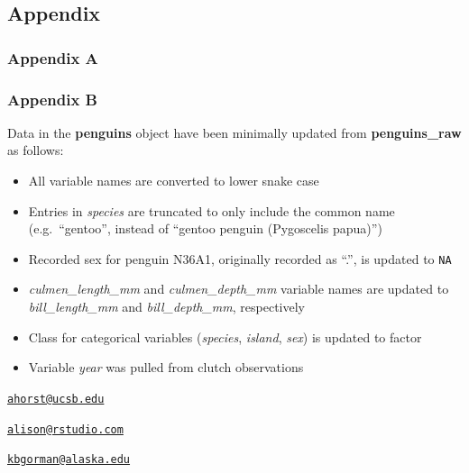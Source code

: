 \hypertarget{appendix}{%
\subsection{Appendix}\label{appendix}}

\hypertarget{appendix-a}{%
\subsubsection{Appendix A}\label{appendix-a}}

\hypertarget{appendix-b}{%
\subsubsection{Appendix B}\label{appendix-b}}

Data in the \textbf{penguins} object have been minimally updated from \textbf{penguins\_raw} as follows:

\begin{itemize}
\tightlist
\item
  All variable names are converted to lower snake case
\item
  Entries in \emph{species} are truncated to only include the common name (e.g.~``gentoo'', instead of ``gentoo penguin (Pygoscelis papua)'')
\item
  Recorded sex for penguin N36A1, originally recorded as ``.'', is updated to \texttt{NA}
\item
  \emph{culmen\_length\_mm} and \emph{culmen\_depth\_mm} variable names are updated to \emph{bill\_length\_mm} and \emph{bill\_depth\_mm}, respectively
\item
  Class for categorical variables (\emph{species}, \emph{island}, \emph{sex}) is updated to factor
\item
  Variable \emph{year} was pulled from clutch observations
\end{itemize}




\address{%
Allison M. Horst\\
Bren School of Environmental Science and Management\\
University of California, Santa Barbara\\ Santa Barbara, CA 93106-5131\\
}
\href{mailto:ahorst@ucsb.edu}{\nolinkurl{ahorst@ucsb.edu}}

\address{%
Alison P. Hill\\
RStudio, PBC\\
250 Northern Ave\\ Boston, MA 02210\\
}
\href{mailto:alison@rstudio.com}{\nolinkurl{alison@rstudio.com}}

\address{%
Kristen B. Gorman\\
University of Alaska Fairbanks College of Fisheries and Ocean Sciences\\
2150 Koyukuk Drive\\ 245 O'Neill Building\\ Fairbanks, AK 99775-7220\\
}
\href{mailto:kbgorman@alaska.edu}{\nolinkurl{kbgorman@alaska.edu}}
